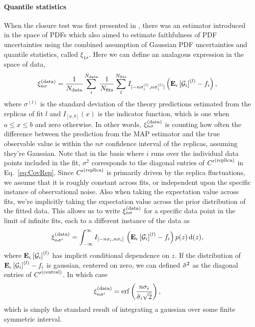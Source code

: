 \paragraph{Quantile statistics}

When the closure test was first presented in \cite{nnpdf30}, there was an estimator
introduced in the space of PDFs which also aimed to estimate faithfulness of
PDF uncertainties using the combined assumption of Gaussian PDF uncertainties
and quantile statistics, called $\xi_{1\sigma}$. Here we can define an
analagous expression in the space of data,
\begin{equation}
    \label{eq:XiDataDef}
    \xi^{(\rm data)}_{n \sigma} = 
        \frac{1}{N_{\rm data}} \sum_{i}^{N_{\rm data}} 
        \frac{1}{N_{\rm fits}} \sum_{l}^{N_{\rm fits}}
            I_{[-n\sigma_i^{(l)}, n\sigma_i^{(l)}]}
            \left( \mathbf{E}_{\epsilon}\left[ \mathcal{G}_i \right]^{(l)} - f_i \right),
\end{equation}
where $\sigma^{(l)}$ is the standard deviation of the theory predictions
estimated from the replicas of fit $l$ and $I_{[a, b]}(x)$ is the indicator
function, which is one when $a \leq x \leq b$ and zero otherwise. In other
words, $\xi^{(\rm data)}_{n \sigma}$ is counting how often the difference between the prediction
from the MAP estimator and the true observable value is within the $n\sigma$
confidence interval of the replicas, assuming they're Gaussian. Note that
in the basis where $i$ runs over the individual data points included in the fit,
$\sigma^2$ corresponds to the diagonal entries of ${{C}^{\prime}}^{(\rm replica)}$ in
Eq.~\ref{eq:CovRep}. Since ${{C}^{\prime}}^{(\rm replica)}$ is primarily driven by the replica
fluctuations, we assume that it is roughly constant across fits, or independent
upon the specific instance of observational noise. Also when taking the expectation
value across fits, we're implicitly taking the expectation value across
the prior distribution of the fitted data. This allows us to write
$\xi^{(\rm data)}_{n \sigma}$ for a specific data point in the limit of infinite fits, each to
a different instance of the data as
\begin{equation}
    \label{eq:XiIExpecVel}
    \xi^{(\rm data)}_{n {\sigma^i}} = 
    \int_{-\infty}^{\infty} I_{[-n \sigma_i, n \sigma_i]}\,
    \left( \mathbf{E}_{\epsilon}\left[ \mathcal{G}_i \right]^{(l)} - f_i \right) 
    p(z)\, 
    {\rm d}(z),
\end{equation}
where $\mathbf{E}_{\epsilon}\left[ \mathcal{G}_i \right]^{(l)}$ has implicit conditional dependence on $z$. If
the distribution of $\mathbf{E}_{\epsilon}\left[ \mathcal{G}_i \right]^{(l)} - f_i$ is gaussian, centered on
zero, we can defined $\hat{\sigma}^2$ as the diagonal entries of ${{C}^{\prime}}^{(\rm central)}$. In
which case
\begin{equation}
    \label{eq:expectedxi}
    \xi^{(\rm data)}_{n {\sigma^i}} = 
    {\rm erf} \left( \frac{n \sigma_i}{\hat{\sigma}_i \sqrt{2}}\right),
\end{equation}
which is simply the standard result of integrating a gaussian over some finite
symmetric interval.

